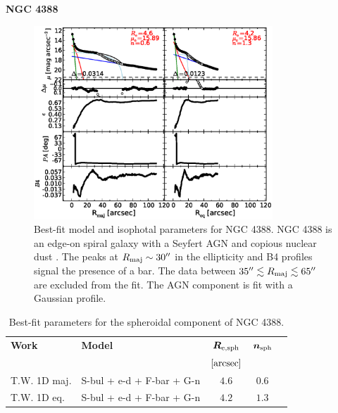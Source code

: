 \documentclass[preprint2]{emulateapj}
\newcommand{\fitfigurewidth}{0.8\textwidth}
\begin{document}
  \clearpage\newpage\noindent
  {\bf NGC 4388 \\}

  \begin{figure}[h]
  \begin{center}
  \includegraphics[width=\fitfigurewidth]{images/n4388_1Dfit.eps}
  \caption{Best-fit model and isophotal parameters for NGC 4388.
  NGC 4388 is an edge-on spiral galaxy with a Seyfert AGN \citep{veroncettyveron2006} 
  and copious nuclear dust \citep{martini2003}.
  The peaks at $R_{\rm maj} \sim 30''$ in the ellipticity and B4 profiles signal the presence of a bar.
  The data between $35'' \lesssim R_{\rm maj} \lesssim 65''$ are excluded from the fit.
  The AGN component is fit with a Gaussian profile.
  }
  \end{center}
  \end{figure}

  \begin{table}[h]
  \small
  \caption{Best-fit parameters for the spheroidal component of NGC 4388.}
  \begin{center}
  \begin{tabular}{llccc}
  \hline
  {\bf Work} & {\bf Model}   & $\bm R_{\rm e,sph}$    & $\bm n_{\rm sph}$ \\
    &  &  $[\rm arcsec]$ & \\
  \hline
  T.W. 1D maj. & S-bul + e-d + F-bar + G-n & $4.6$  &  $0.6$ \\
  T.W. 1D eq.  & S-bul + e-d + F-bar + G-n & $4.2$  &  $1.3$ \\
  \hline
  \end{tabular}
  \end{center}
  \label{tab:n4388}
  \end{table}
\end{document}
